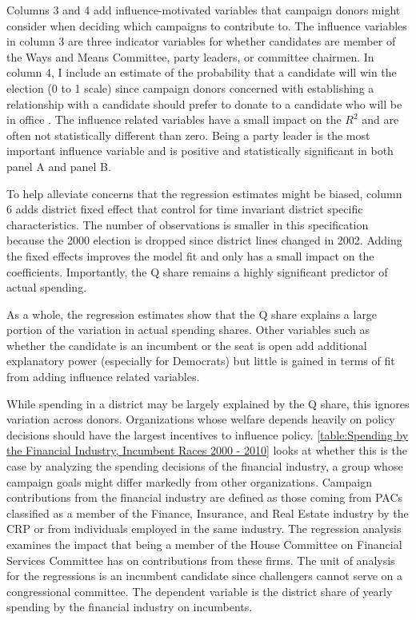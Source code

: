 \documentclass[12pt,final,fleqn]{article}
\theoremstyle{plain}
\begin{document}
Columns 3 and 4 add influence-motivated variables that campaign donors might consider when deciding which campaigns to contribute to. The influence variables in column 3 are three indicator variables for whether candidates are member of the Ways and Means Committee, party leaders, or committee chairmen. In column 4, I include an estimate of the probability that a candidate will win the election (0 to 1 scale) since campaign donors concerned with establishing a relationship with a candidate should prefer to donate to a candidate who will be in office \citep[see for instance][]{snyder1990campaign}. The influence related variables have a small impact on the $R^2$ and are often not statistically different than zero. Being a party leader is the most important influence variable and is positive and statistically significant in both panel A and panel B. 

To help alleviate concerns that the regression estimates might be biased, column 6 adds district fixed effect that control for time invariant district specific characteristics. The number of observations is smaller in this specification because the 2000 election is dropped since district lines changed in 2002. Adding the fixed effects improves the model fit and only has a small impact on the coefficients. Importantly, the Q share remains a highly significant predictor of actual spending.

As a whole, the regression estimates show that the Q share explains a large portion of the variation in actual spending shares. Other variables such as whether the candidate is an incumbent or the seat is open add additional explanatory power (especially for Democrats) but little is gained in terms of fit from adding influence related variables.

While spending in a district may be largely explained by the Q share, this ignores variation across donors. Organizations whose welfare depends heavily on policy decisions should have the largest incentives to influence policy. \autoref{table:Spending by the Financial Industry, Incumbent Races 2000 - 2010} looks at whether this is the case by analyzing the spending decisions of the financial industry, a group whose campaign goals might differ markedly from other organizations. Campaign contributions from the financial industry are defined as those coming from PACs classified as a member of the Finance, Insurance, and Real Estate industry by the CRP or from individuals employed in the same industry. The regression analysis examines the impact that being a member of the House Committee on Financial Services Committee has on contributions from these firms. The unit of analysis for the regressions is an incumbent candidate since challengers cannot serve on a congressional committee. The dependent variable is the district share of yearly spending by the financial industry on incumbents. 
\end{document}
